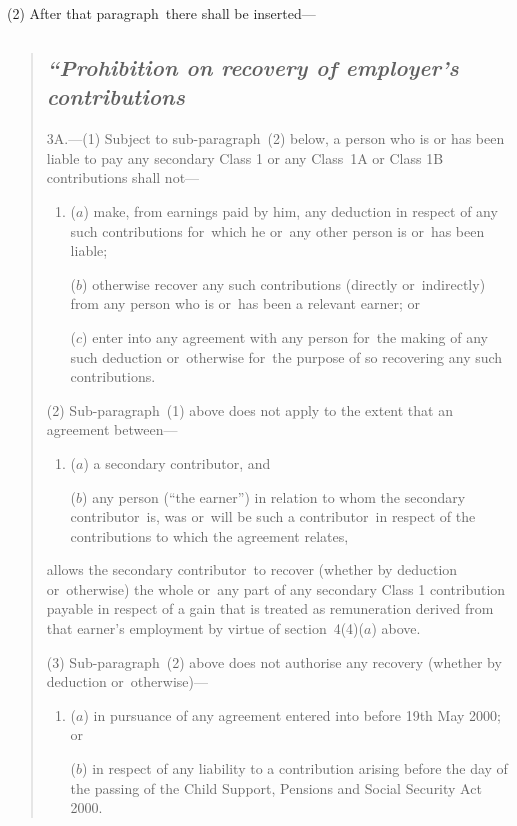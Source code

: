 \documentclass[12pt,a4paper]{article}
\begin{document}
(2) After that paragraph~there shall be inserted—
\begin{quotation}
\subsection*{\itshape\sloppy “Prohibition on recovery of employer’s contributions}

3A.---(1) Subject to sub-paragraph~(2)  below, a person who is or has been liable to pay any secondary Class 1 or any Class~1A or Class 1B contributions shall not—
\begin{enumerate}\item[]
($a$) make, from earnings paid by him, any deduction in respect of any such contributions for~which he or~any other person is or~has been liable;

($b$) otherwise recover any such contributions (directly or~indirectly) from any person who is or~has been a relevant earner; or

($c$) enter into any agreement with any person for~the making of any such deduction or~otherwise for~the purpose of so recovering any such contributions.
\end{enumerate}

(2) Sub-paragraph~(1)  above does not apply to the extent that an agreement between—
\begin{enumerate}\item[]
($a$) a secondary contributor, and

($b$) any person (“the earner”) in relation to whom the secondary contributor~is, was or~will be such a contributor~in respect of the contributions to which the agreement relates,
\end{enumerate}
allows the secondary contributor~to recover (whether by deduction or~otherwise) the whole or~any part of any secondary Class 1 contribution payable in respect of a gain that is treated as remuneration derived from that earner’s employment by virtue of section~4(4)($a$)  above.

(3) Sub-paragraph~(2)  above does not authorise any recovery (whether by deduction or~otherwise)—
\begin{enumerate}\item[]
($a$) in pursuance of any agreement entered into before 19th May 2000; or

($b$) in respect of any liability to a contribution arising before the day of the passing of the Child Support, Pensions and Social Security Act 2000. 
\end{enumerate}


\end{quotation}
\end{document}
